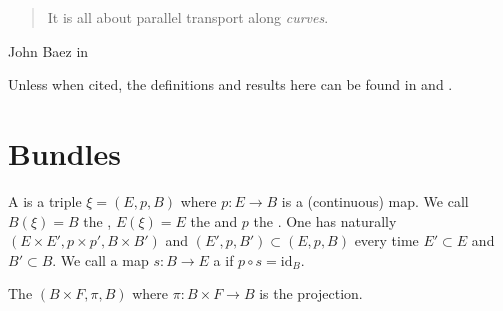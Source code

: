 
\begin{quote}
 It is all about parallel transport along \emph{curves}.
\end{quote} John Baez in \cite{baez-2004}

\bigskip
\bigskip

Unless when cited, the definitions and results here can be found in \cite{kobayashi1} and \cite{husemoller}.

\section{Bundles}

\begin{definition}
 A  is a triple $\xi=(E,p,B)$ where $p:E\rightarrow B$ is a (continuous) map. We call $B(\xi)=B$ the , $E(\xi)=E$ the  and $p$ the . One has naturally  $(E\times E',p\times p',B\times B')$ and  $(E',p,B')\subset (E,p,B)$ every time $E'\subset E$ and $B'\subset B$. We call a map $s:B\rightarrow E$ a  if $p\circ s=\text{id}_B$.
\end{definition}

\begin{example}The  $(B\times F,\pi,B)$ where $\pi:B\times F\rightarrow B$ is the projection.
\end{example}



